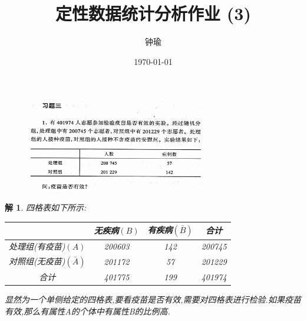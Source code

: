 \documentclass[11pt,a4paper]{ctexart}
\title{定性数据统计分析作业 (3)}
\author{钟瑜 \quad 222018314210044}
\date{\today}
\newtheorem*{solution}{解}
\begin{document}
\maketitle
\pagestyle{plain}%
\begin{figure}[H]
	\includegraphics[width=0.7\textwidth]{1.png}
\end{figure}
\begin{solution}
四格表如下所示:
\begin{table}[!htbp]   %
	\centering
	\begin{tabular}{cccc}
		\toprule[1.5pt]
		 & 无疾病$ (B) $ & 有疾病$(\bar{B})$ & 合计\\
		\midrule[1pt]
		处理组(有疫苗)$ (A) $ & 200603 & 142 & 200745\\
		对照组(无疫苗)$(\bar{A})$ & 201172  & 57 & 201229\\
		\midrule[1pt]
		合计 & 401775 & 199 & 401974\\
		\bottomrule[1.5pt]
	\end{tabular}
\end{table}
显然为一个单侧给定的四格表,要看疫苗是否有效,需要对四格表进行检验.如果疫苗有效,那么有属性A的个体中有属性B的比例高.

\end{solution}
\end{document}
